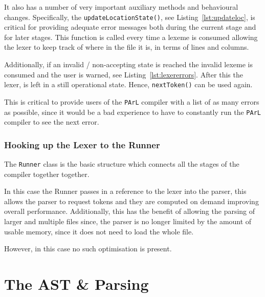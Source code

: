 \documentclass[article]{uom-coursework}
\newcommand{\listref}[1]{Listing~\ref{lst:#1}}
\begin{document}
It also has a number of very important auxiliary
methods and behavioural changes. Specifically, the
\texttt{updateLocationState()}, see
\listref{updateloc}, is critical for providing
adequate error messages both during the current
stage and for later stages. This function is
called every time a lexeme is consumed allowing
the lexer to keep track of where in the file it
is, in terms of lines and columns.



Additionally, if an invalid / non-accepting state
is reached the invalid lexeme is consumed and the
user is warned, see \listref{lexererrors}. After
this the lexer, is left in a still operational state.
Hence, \texttt{nextToken()} can be used again.

 This is critical to provide users of the
 \texttt{PArL} compiler with a list of as many
 errors as possible, since it would be a bad
 experience to have to constantly run the
 \texttt{PArL} compiler to see the next error.



\subsubsection{Hooking up the Lexer to the Runner}

The \texttt{Runner} class is the basic structure
which connects all the stages of the
compiler together together.

In this case the Runner passes in a reference to
the lexer into the parser, this allows the parser
to request tokens and they are computed on demand
improving overall performance. Additionally, this
has the benefit of allowing the parsing of larger
and multiple files since, the parser is no longer
limited by the amount of usable memory, since it
does not need to load the whole file.

However, in this case no such optimisation is
present.



\section{The AST \& Parsing}
\end{document}
